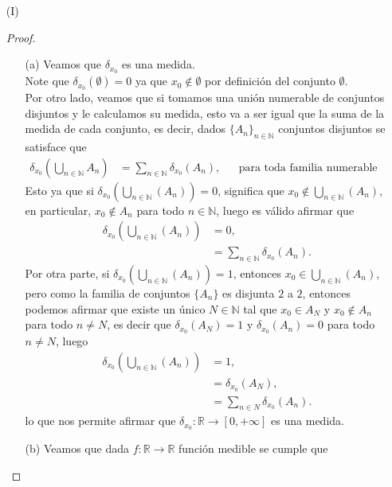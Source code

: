 \begin{enumerate}
\item[(I)]\phantom{I}\\
\begin{proof}
  \begin{enumerate}
    \item[(a)] Veamos que $\delta_{x_0}$ es una medida.\\
      Note que $\delta_{x_0}(\emptyset)=0$ ya que $x_0\notin \emptyset$ por definición del conjunto $\emptyset$.\\
      Por otro lado, veamos que si tomamos una unión numerable de conjuntos disjuntos y le calculamos su medida, esto va a ser igual que la suma de la medida de cada conjunto, es decir, dados $\{A_{n}\}_{n\in\mathbb{N}}$ conjuntos disjuntos se satisface que
      \begin{align*}
        \delta_{x_0}\left( \bigcup_{n\in\mathbb{N}}A_{n} \right)&=\sum_{n\in\mathbb{N}}\delta_{x_0}\left( A_{n} \right), &&\text{para toda familia numerable de conjuntos disjuntos.}
      \end{align*}
      Esto ya que si $\delta_{x_0}\left( \bigcup_{n\in\mathbb{N}}(A_{n}) \right)=0$, significa que $x_0\notin \bigcup_{n\in\mathbb{N}}(A_{n})$, en particular, $x_0\notin A_{n}$ para todo $n\in\mathbb{N}$, luego es válido afirmar que
      \begin{align*}
        \delta_{x_0}\left( \bigcup_{n\in\mathbb{N}}(A_{n}) \right)&=0,\\
        &=\sum_{n\in\mathbb{N}}\delta_{x_0}(A_{n}).
      \end{align*}
      Por otra parte, si $\delta_{x_0}\left( \bigcup_{n\in\mathbb{N}}(A_{n}) \right)=1$, entonces $x_0\in \bigcup_{n\in\mathbb{N}}(A_{n})$, pero como la familia de conjuntos $\{A_{n}\}$ es disjunta $2$ a $2$, entonces podemos afirmar que existe un único $N\in\mathbb{N}$ tal que $x_0\in A_N$ y $x_0\notin A_n$ para todo $n\neq N$, es decir que $\delta_{x_0}(A_{N})=1$ y $\delta_{x_0}(A_{n})=0$ para todo $n\neq N$, luego
      \begin{align*}
        \delta_{x_0}\left( \bigcup_{n\in\mathbb{N}}(A_{n}) \right)&=1,\\
        &=\delta_{x_0}(A_{N}),\\
        &=\sum_{n\in N}\delta_{x_0}(A_{n}).
      \end{align*}
      lo que nos permite afirmar que $\delta_{x_0}:\mathbb{R}\to[0,+\infty]$ es una medida.
    \item[(b)] Veamos que dada $f:\mathbb{R}\to\mathbb{R}$ función medible se cumple que

\end{enumerate}
\end{proof}
\end{enumerate}
